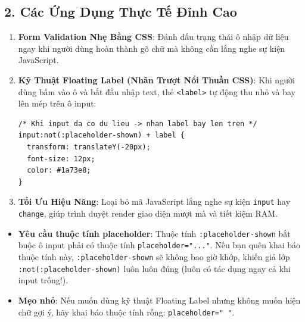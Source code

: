 \documentclass[11pt,oneside]{book}
\newcommand{\codeinline}[1]{\textcolor{accentOrange}{\texttt{#1}}}
\begin{document}
\subsection{2. Các Ứng Dụng Thực Tế Đỉnh Cao}

\begin{tipBox}
\begin{enumerate}[leftmargin=1.5em, itemsep=4pt, parsep=0pt]
    \item \textbf{Form Validation Nhẹ Bằng CSS}: Đánh dấu trạng thái ô nhập dữ liệu ngay khi người dùng hoàn thành gõ chữ mà không cần lắng nghe sự kiện JavaScript.
    \item \textbf{Kỹ Thuật Floating Label (Nhãn Trượt Nổi Thuần CSS)}: Khi người dùng bấm vào ô và bắt đầu nhập text, thẻ \codeinline{<label>} tự động thu nhỏ và bay lên mép trên ô input:
    \begin{codeWindow}
\begin{lstlisting}[language=HTML5]
/* Khi input da co du lieu -> nhan label bay len tren */
input:not(:placeholder-shown) + label {
  transform: translateY(-20px);
  font-size: 12px;
  color: #1a73e8;
}
\end{lstlisting}
    \end{codeWindow}
    \item \textbf{Tối Ưu Hiệu Năng}: Loại bỏ mã JavaScript lắng nghe sự kiện \codeinline{input} hay \codeinline{change}, giúp trình duyệt render giao diện mượt mà và tiết kiệm RAM.
\end{enumerate}
\end{tipBox}

\begin{warnBox}
\begin{itemize}[leftmargin=1.5em, itemsep=3pt, parsep=0pt]
    \item \textbf{Yêu cầu thuộc tính placeholder}: Thuộc tính \codeinline{:placeholder-shown} bắt buộc ô input phải có thuộc tính \codeinline{placeholder="..."}. Nếu bạn quên khai báo thuộc tính này, \codeinline{:placeholder-shown} sẽ không bao giờ khớp, khiến giả lớp \codeinline{:not(:placeholder-shown)} luôn luôn đúng (luôn có tác dụng ngay cả khi input trống!).
    \item \textbf{Mẹo nhỏ}: Nếu muốn dùng kỹ thuật Floating Label nhưng không muốn hiện chữ gợi ý, hãy khai báo thuộc tính rỗng: \codeinline{placeholder=" "}.
\end{itemize}
\end{warnBox}
\end{document}
